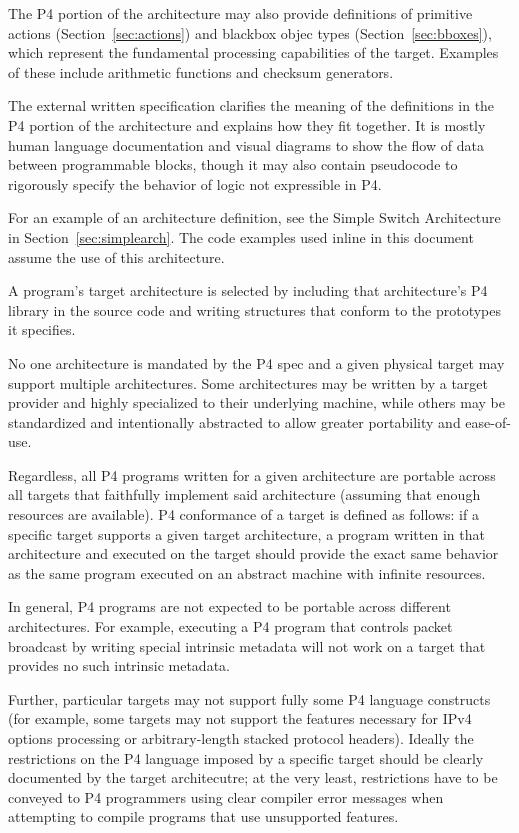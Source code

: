 \documentclass[12pt]{article}
\begin{document}
The P4 portion of the architecture may also provide definitions of primitive
actions (Section~\ref{sec:actions}) and blackbox objec types
(Section~\ref{sec:bboxes}), which represent the fundamental processing
capabilities of the target. Examples of these include arithmetic functions and
checksum generators.

The external written specification clarifies the meaning of the definitions
in the P4 portion of the architecture and explains how they fit together. It
is mostly human language documentation and visual diagrams to show the flow of
data between programmable blocks, though it may also contain pseudocode to
rigorously specify the behavior of logic not expressible in P4.

For an example of an architecture definition, see the Simple Switch Architecture
in Section~\ref{sec:simplearch}. The code examples used inline in this document
assume the use of this architecture.


A program's target architecture is selected by including that architecture's P4
library in the source code and writing structures that conform to the prototypes
it specifies.

No one architecture is mandated by the P4 spec and a given physical target may 
support multiple architectures. Some architectures may be written by a target
provider and highly specialized to their underlying machine, while others may
be standardized and intentionally abstracted to allow greater portability and
ease-of-use.

Regardless, all P4 programs written for a given architecture are portable across
all targets that faithfully implement said architecture (assuming that enough
resources are available). P4 conformance of a target is defined as follows: if a
specific target supports a given target architecture, a program written in that
architecture and executed on the target should provide the exact same behavior
as the same program executed  on an abstract machine with infinite resources.

In general, P4 programs are not expected to be portable across different
architectures. For example, executing a P4 program that controls packet
broadcast by writing special intrinsic metadata will not work on a target that
provides no such intrinsic metadata.

Further, particular targets may not support fully some P4 language constructs
(for example, some targets may not support the features necessary for IPv4
options processing or arbitrary-length stacked protocol headers). Ideally the
restrictions on the P4 language imposed by a specific target should be clearly
documented by the target architecutre; at the very least, restrictions have to
be conveyed to P4 programmers using clear compiler error messages when
attempting to compile programs that use unsupported features.
\end{document}
